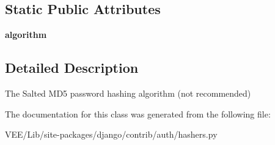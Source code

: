 \subsection*{Static Public Attributes}
\begin{DoxyCompactItemize}
\item 
\mbox{\label{classdjango_1_1contrib_1_1auth_1_1hashers_1_1_m_d5_password_hasher_add72c0e3bb1924101ebee5dcef335425}} 
{\bfseries algorithm}
\end{DoxyCompactItemize}


\subsection{Detailed Description}
\begin{DoxyVerb}The Salted MD5 password hashing algorithm (not recommended)
\end{DoxyVerb}
 

The documentation for this class was generated from the following file\+:\begin{DoxyCompactItemize}
\item 
V\+E\+E/\+Lib/site-\/packages/django/contrib/auth/hashers.\+py\end{DoxyCompactItemize}
